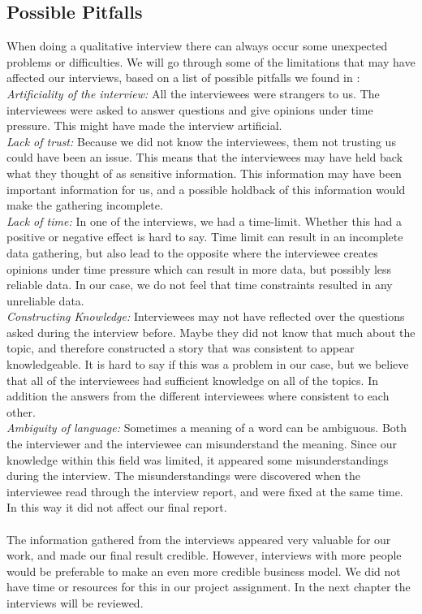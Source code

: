 \subsection{Possible Pitfalls}
When doing a qualitative interview there can always occur some unexpected problems or difficulties. We will go through some of the limitations that may have affected our interviews, based on a list of possible pitfalls we found in \cite{interview}:\\
\emph{Artificiality of the interview:} All the interviewees were strangers to us. The interviewees were asked to answer questions  and give opinions under time pressure. This might have made the interview artificial. \\
\emph{Lack of trust:} Because we did not know the interviewees, them not trusting us could have been an issue. This means that the interviewees may have held back what they thought of as sensitive information. This information may have been important information for us, and a possible holdback of this information would make the gathering incomplete. \\
\emph{Lack of time:} In one of the interviews, we had a time-limit. Whether this had a positive or negative effect is hard to say. Time limit can result in an incomplete data gathering, but also lead to the opposite where the interviewee creates opinions under time pressure which can result in more data, but possibly less reliable data. In our case, we do not feel that time constraints resulted in any unreliable data. \\
\emph{Constructing Knowledge:} Interviewees may not have reflected over the questions asked during the interview before. Maybe they did not know that much about the topic, and therefore constructed a story that was consistent to appear knowledgeable. It is hard to say if this was a problem in our case, but we believe that all of the interviewees had sufficient knowledge on all of the topics. In addition the answers from the different interviewees where consistent to each other. \\
\emph{Ambiguity of language:} Sometimes a meaning of a word can be ambiguous. Both the interviewer and the interviewee can misunderstand the meaning. Since our knowledge within this field was limited, it appeared some misunderstandings during the interview. The misunderstandings were discovered when the interviewee read through the interview report, and were fixed at the same time. In this way it did not affect our final report.  \\ \\
The information gathered from the interviews appeared very valuable for our work, and made our final result credible. However, interviews with more people would be preferable to make an even more credible business model. We did not have time or resources for this in our project assignment. In the next chapter the interviews will be reviewed.


